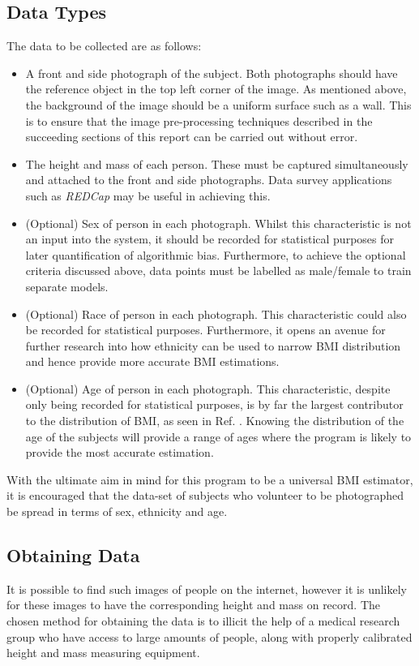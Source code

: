 \subsection{Data Types}
The data to be collected are as follows:
\begin{itemize}
\item A front and side photograph of the subject.
Both photographs should have the reference object in the top left corner of the image.
As mentioned above, the background of the image should be a uniform surface such as a wall.
This is to ensure that the image pre-processing techniques described in the succeeding sections of this report can be carried out without error.
\item The height and mass of each person.
These must be captured simultaneously and attached to the front and side photographs.
Data survey applications such as \textit{REDCap} may be useful in achieving this.
\item (Optional) Sex of person in each photograph.
Whilst this characteristic is not an input into the system, it should be recorded for statistical purposes for later quantification of algorithmic bias.
Furthermore, to achieve the optional criteria discussed above, data points must be labelled as male/female to train separate models.
\item (Optional) Race of person in each photograph.
This characteristic could also be recorded for statistical purposes.
Furthermore, it opens an avenue for further research into how ethnicity can be used to narrow BMI distribution and hence provide more accurate BMI estimations.
\item (Optional) Age of person in each photograph.
This characteristic, despite only being recorded for statistical purposes, is by far the largest contributor to the distribution of BMI, as seen in Ref. \cite{bmiage}.
Knowing the distribution of the age of the subjects will provide a range of ages where the program is likely to provide the most accurate estimation.
\end{itemize}
With the ultimate aim in mind for this program to be a universal BMI estimator, it is encouraged that the data-set of subjects who volunteer to be photographed be spread in terms of sex, ethnicity and age.
\subsection{Obtaining Data}
It is possible to find such images of people on the internet, however it is unlikely for these images to have the corresponding height and mass on record.
The chosen method for obtaining the data is to illicit the help of a medical research group who have access to large amounts of people, along with properly calibrated height and mass measuring equipment.

